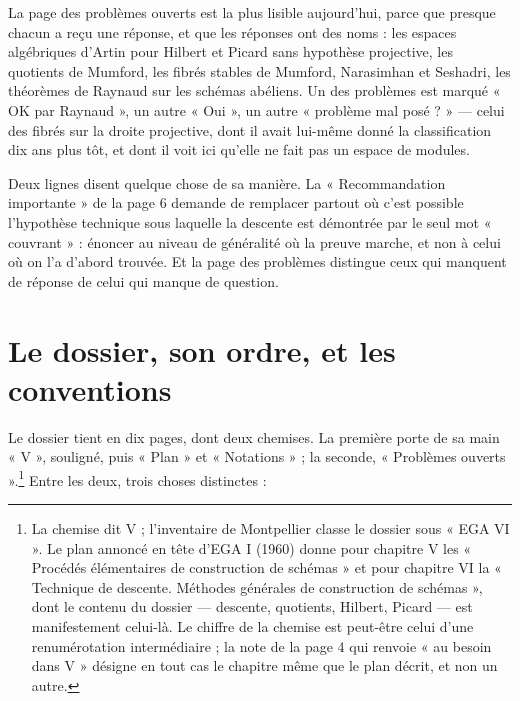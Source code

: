 \documentclass[11pt,a4paper]{article}
\begin{document}
\begin{resume}
La page des problèmes ouverts est la plus lisible aujourd'hui, parce que
presque chacun a reçu une réponse, et que les réponses ont des noms : les
espaces algébriques d'Artin pour Hilbert et Picard sans hypothèse projective,
les quotients de Mumford, les fibrés stables de Mumford, Narasimhan et
Seshadri, les théorèmes de Raynaud sur les schémas abéliens. Un des problèmes
est marqué « OK par Raynaud », un autre « Oui », un autre « problème mal
posé ? » — celui des fibrés sur la droite projective, dont il avait lui-même
donné la classification dix ans plus tôt, et dont il voit ici qu'elle ne fait
pas un espace de modules.

Deux lignes disent quelque chose de sa manière. La « Recommandation
importante » de la page 6 demande de remplacer partout où c'est possible
l'hypothèse technique sous laquelle la descente est démontrée par le seul mot
« couvrant » : énoncer au niveau de généralité où la preuve marche, et non à
celui où on l'a d'abord trouvée. Et la page des problèmes distingue ceux qui
manquent de réponse de celui qui manque de question.

\end{resume}

\section*{Le dossier, son ordre, et les conventions}

Le dossier tient en dix pages, dont deux chemises. La première porte de sa
main « V », souligné, puis « Plan » et « Notations » ; la seconde,
« Problèmes ouverts ».\footnote{La chemise dit V ; l'inventaire de
Montpellier classe le dossier sous « EGA VI ». Le plan annoncé en tête d'EGA I
(1960) donne pour chapitre V les « Procédés élémentaires de construction de
schémas » et pour chapitre VI la « Technique de descente. Méthodes générales de
construction de schémas », dont le contenu du dossier — descente, quotients,
Hilbert, Picard — est manifestement celui-là. Le chiffre de la chemise est
peut-être celui d'une renumérotation intermédiaire ; la note de la page 4 qui
renvoie « au besoin dans V » désigne en tout cas le chapitre même que le plan
décrit, et non un autre.} Entre les deux, trois choses distinctes :
\end{document}
